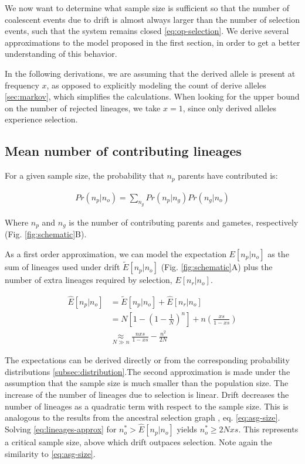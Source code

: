 \documentclass[review]{elsarticle}
\begin{document}
We now want to determine what sample size is sufficient so that the number of coalescent events due
to drift is almost always larger than the number of selection events, such that the system remains
closed \eqref{eq:op-selection}. We derive several approximations to the model proposed in the first
section, in order to get a better understanding of this behavior.

In the following derivations, we are assuming that the derived allele is present at frequency $x$,
as opposed to explicitly modeling the count of derive alleles \ref{sec:markov}, which simplifies the
calculations. When looking for the upper bound on the number of rejected lineages, we take $x=1$,
since only derived alleles experience selection.

\subsection{Mean number of contributing lineages}
\label{sec:mean-contr}

For a given sample size, the probability that $n_p$ parents have contributed is:

\begin{align}
  \label{eq:conditional}
  Pr(n_p | n_o) = \sum_{n_g} Pr(n_p | n_g)Pr(n_g | n_o)
\end{align}

Where $n_p$ and $n_g$ is the number of contributing parents and gametes, respectively (Fig.
\ref{fig:schematic}B).

As a first order approximation, we can model the expectation $E[n_p | n_o]$ as the sum of lineages
used under drift $\tilde{E}[n_p | n_o]$ (Fig. \ref{fig:schematic}A) plus the number of extra
lineages required by selection, $E[n_r | n_o]$.

\begin{equation*}
  \begin{aligned}
    \label{eq:lineages-approx}
    \hat{E}[n_p  | n_o] &= \tilde{E}[n_p | n_o] + \hat{E}[n_r | n_o] \\
    &= N\left[1-\left( 1 - \frac{1}{N} \right)^n \right] + n\left( \frac{xs}{1-xs}\right) \\
    &\underset{N\gg n}{\approx} \frac{nxs}{1-xs} - \frac{n^2}{2N}
  \end{aligned}
\end{equation*}

The expectations can be derived directly or from the corresponding probability distributions
\ref{subsec:distribution}.The second approximation is made under the assumption that the sample size
is much smaller than the population size. The increase of the number of lineages due to selection is
linear. Drift decreases the number of lineages as a quadratic term with respect to the sample size.
This is analogous to the results from the ancestral selection graph \citep{KroneNeuhauser1997}, eq.
\eqref{eq:asg-size}. Solving \eqref{eq:lineages-approx} for $n_o^* > \hat{E}[n_p | n_o]$ yields
$n_o^* \ge 2Nxs$. This represents a critical sample size, above which drift outpaces selection.
Note again the similarity to \eqref{eq:asg-size}.
\end{document}
